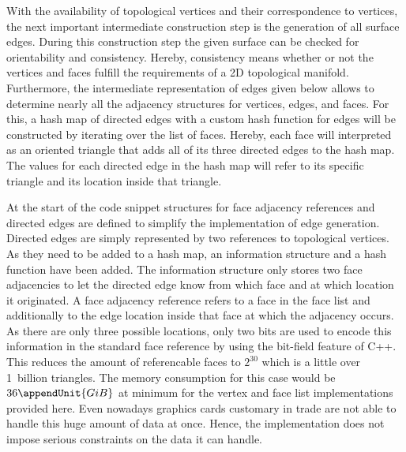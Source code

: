 \documentclass{stdlocal}
\begin{document}
  With the availability of topological vertices and their correspondence to vertices, the next important intermediate construction step is the generation of all surface edges.
  During this construction step the given surface can be checked for orientability and consistency.
  Hereby, consistency means whether or not the vertices and faces fulfill the requirements of a 2D topological manifold.
  Furthermore, the intermediate representation of edges given below allows to determine nearly all the adjacency structures for vertices, edges, and faces.
  For this, a hash map of directed edges with a custom hash function for edges will be constructed by iterating over the list of faces.
  Hereby, each face will interpreted as an oriented triangle that adds all of its three directed edges to the hash map.
  The values for each directed edge in the hash map will refer to its specific triangle and its location inside that triangle.

  At the start of the code snippet structures for face adjacency references and directed edges are defined to simplify the implementation of edge generation.
  Directed edges are simply represented by two references to topological vertices.
  As they need to be added to a hash map, an information structure and a hash function have been added.
  The information structure only stores two face adjacencies to let the directed edge know from which face and at which location it originated.
  A face adjacency reference refers to a face in the face list and additionally to the edge location inside that face at which the adjacency occurs.
  As there are only three possible locations, only two bits are used to encode this information in the standard face reference by using the bit-field feature of C++.
  This reduces the amount of referencable faces to $2^{30}$ which is a little over 1~billion triangles.
  The memory consumption for this case would be $36\appendUnit{GiB}$ at minimum for the vertex and face list implementations provided here.
  Even nowadays graphics cards customary in trade are not able to handle this huge amount of data at once.
  Hence, the implementation does not impose serious constraints on the data it can handle.
\end{document}
